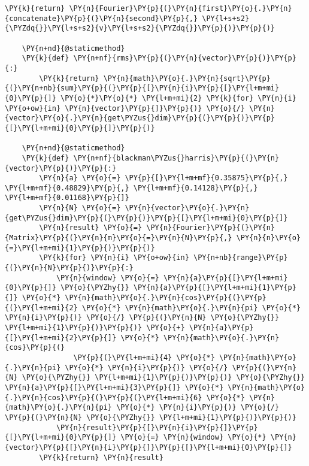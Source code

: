 \begin{Verbatim}[commandchars=\\\{\}]
            \PY{k}{return} \PY{n}{Fourier}\PY{p}{(}\PY{n}{first}\PY{o}{.}\PY{n}{concatenate}\PY{p}{(}\PY{n}{second}\PY{p}{,} \PY{l+s+s2}{\PYZdq{}}\PY{l+s+s2}{v}\PY{l+s+s2}{\PYZdq{}}\PY{p}{)}\PY{p}{)}

    \PY{n+nd}{@staticmethod}
    \PY{k}{def} \PY{n+nf}{rms}\PY{p}{(}\PY{n}{vector}\PY{p}{)}\PY{p}{:}
        \PY{k}{return} \PY{n}{math}\PY{o}{.}\PY{n}{sqrt}\PY{p}{(}\PY{n+nb}{sum}\PY{p}{(}\PY{p}{[}\PY{n}{i}\PY{p}{[}\PY{l+m+mi}{0}\PY{p}{]} \PY{o}{*}\PY{o}{*} \PY{l+m+mi}{2} \PY{k}{for} \PY{n}{i} \PY{o+ow}{in} \PY{n}{vector}\PY{p}{]}\PY{p}{)} \PY{o}{/} \PY{n}{vector}\PY{o}{.}\PY{n}{get\PYZus{}dim}\PY{p}{(}\PY{p}{)}\PY{p}{[}\PY{l+m+mi}{0}\PY{p}{]}\PY{p}{)}

    \PY{n+nd}{@staticmethod}
    \PY{k}{def} \PY{n+nf}{blackman\PYZus{}harris}\PY{p}{(}\PY{n}{vector}\PY{p}{)}\PY{p}{:}
        \PY{n}{a} \PY{o}{=} \PY{p}{[}\PY{l+m+mf}{0.35875}\PY{p}{,} \PY{l+m+mf}{0.48829}\PY{p}{,} \PY{l+m+mf}{0.14128}\PY{p}{,} \PY{l+m+mf}{0.01168}\PY{p}{]}
        \PY{n}{N} \PY{o}{=} \PY{n}{vector}\PY{o}{.}\PY{n}{get\PYZus{}dim}\PY{p}{(}\PY{p}{)}\PY{p}{[}\PY{l+m+mi}{0}\PY{p}{]}
        \PY{n}{result} \PY{o}{=} \PY{n}{Fourier}\PY{p}{(}\PY{n}{Matrix}\PY{p}{(}\PY{n}{m}\PY{o}{=}\PY{n}{N}\PY{p}{,} \PY{n}{n}\PY{o}{=}\PY{l+m+mi}{1}\PY{p}{)}\PY{p}{)}
        \PY{k}{for} \PY{n}{i} \PY{o+ow}{in} \PY{n+nb}{range}\PY{p}{(}\PY{n}{N}\PY{p}{)}\PY{p}{:}
            \PY{n}{window} \PY{o}{=} \PY{n}{a}\PY{p}{[}\PY{l+m+mi}{0}\PY{p}{]} \PY{o}{\PYZhy{}} \PY{n}{a}\PY{p}{[}\PY{l+m+mi}{1}\PY{p}{]} \PY{o}{*} \PY{n}{math}\PY{o}{.}\PY{n}{cos}\PY{p}{(}\PY{p}{(}\PY{l+m+mi}{2} \PY{o}{*} \PY{n}{math}\PY{o}{.}\PY{n}{pi} \PY{o}{*} \PY{n}{i}\PY{p}{)} \PY{o}{/} \PY{p}{(}\PY{n}{N} \PY{o}{\PYZhy{}} \PY{l+m+mi}{1}\PY{p}{)}\PY{p}{)} \PY{o}{+} \PY{n}{a}\PY{p}{[}\PY{l+m+mi}{2}\PY{p}{]} \PY{o}{*} \PY{n}{math}\PY{o}{.}\PY{n}{cos}\PY{p}{(}
                \PY{p}{(}\PY{l+m+mi}{4} \PY{o}{*} \PY{n}{math}\PY{o}{.}\PY{n}{pi} \PY{o}{*} \PY{n}{i}\PY{p}{)} \PY{o}{/} \PY{p}{(}\PY{n}{N} \PY{o}{\PYZhy{}} \PY{l+m+mi}{1}\PY{p}{)}\PY{p}{)} \PY{o}{\PYZhy{}} \PY{n}{a}\PY{p}{[}\PY{l+m+mi}{3}\PY{p}{]} \PY{o}{*} \PY{n}{math}\PY{o}{.}\PY{n}{cos}\PY{p}{(}\PY{p}{(}\PY{l+m+mi}{6} \PY{o}{*} \PY{n}{math}\PY{o}{.}\PY{n}{pi} \PY{o}{*} \PY{n}{i}\PY{p}{)} \PY{o}{/} \PY{p}{(}\PY{n}{N} \PY{o}{\PYZhy{}} \PY{l+m+mi}{1}\PY{p}{)}\PY{p}{)}
            \PY{n}{result}\PY{p}{[}\PY{n}{i}\PY{p}{]}\PY{p}{[}\PY{l+m+mi}{0}\PY{p}{]} \PY{o}{=} \PY{n}{window} \PY{o}{*} \PY{n}{vector}\PY{p}{[}\PY{n}{i}\PY{p}{]}\PY{p}{[}\PY{l+m+mi}{0}\PY{p}{]}
        \PY{k}{return} \PY{n}{result}


\end{Verbatim}
